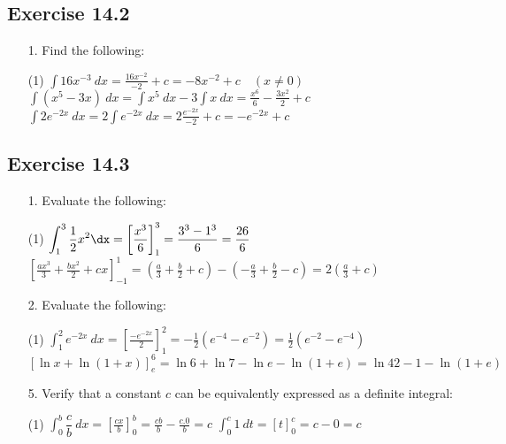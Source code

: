 \documentclass{./../../Latex/homework}
\begin{document}
\subsection*{Exercise 14.2}

\begin{enumerate}	
\item[1.] Find the following: 
\begin{tasks}(1)
\task[(a)] $\displaystyle\int 16 x^{-3}\ d x= \frac{16x^{-2}}{-2}+c=-8 x^{-2}+c \quad(x \neq 0)$
\task[(c)] $\displaystyle\int (x^5-3x) \ dx =\int x^5 \ dx-3 \int x \ dx=\frac{x^6}{6}-\frac{3x^2}{2} +c$
\task[(d)] $ \displaystyle\int 2e^{-2x} \ dx = 2 \displaystyle\int e^{-2x} \ dx = 2 \frac{e^{-2x}}{-2} + c= -e^{-2x} + c$
\end{tasks}
\end{enumerate}
\subsection*{Exercise 14.3}

\begin{enumerate}

\item[1.] Evaluate the following:
\begin{tasks}(1)
\task[(a)] $ \displaystyle\int_1^3 \dfrac{1}{2}x^2 \dx = \left[\frac{x^3}{6} \right]_1^3=\frac{3^3-1^3}{6}=\frac{26}{6}$
\task[(e)] $\displaystyle \left[\frac{ax^3}{3}+\frac{bx^2}{2}+c x\right]_{-1}^1=\left(\frac{a}{3}+\frac{b}{2}+c\right)-\left(-\frac{a}{3}+\frac{b}{2}-c\right)=2\left(\frac{a}{3}+c\right)$ 
\end{tasks}

\item[2.] Evaluate the following:
\begin{tasks}(1)
\task[(a)] $ \displaystyle\int_1^2 e^{-2x} \ dx = \left[\frac{-e^{-2 x}}{2} \right]_1^2=-\frac{1}{2}\left(e^{-4}-e^{-2}\right)=\frac{1}{2}\left(e^{-2}-e^{-4}\right) $
\task[(d)] $ [\ln x+\ln (1+x)]_e^6= \ln 6+ \ln 7-\ln e - \ln (1+e) = \ln 42-1-\ln(1+e)$
\end{tasks}

\item[5.] Verify that a constant $c$ can be equivalently expressed as a definite integral:
\begin{tasks}(1)
\task $ \displaystyle \int_0^b \dfrac{c}{b}\ dx = \left[\frac{cx}{b}\right]_0^b = \frac{cb}{b}-\frac{c.0}{b} = c	$
\task $ \displaystyle  \int_0^c 1\ dt = [t]_0^c = c-0 = c 	$
\end{tasks}

\end{enumerate}
\end{document}
